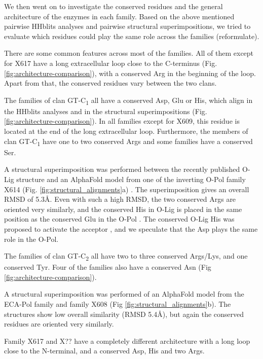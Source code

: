\documentclass{article}
\begin{document}
We then went on to investigate the conserved residues and the general architecture of the enzymes in each family. Based on the above mentioned pairwise HHblits analyses and pairwise structural superimpositions, we tried to evaluate which residues could play the same role across the families (reformulate).

There are some common features across most of the families. All of them except for X617 have a long extracellular loop close to the C-terminus (Fig. \ref{fig:architecture-comparison}), with a conserved Arg in the beginning of the loop. Apart from that, the conserved residues vary between the two clans.

The families of clan GT-C\textsubscript{1} all have a conserved Asp, Glu or His, which align in the HHblits analyses and in the structural superimpositions (Fig. \ref{fig:architecture-comparison}). In all families except for X609, this residue is located at the end of the long extracellular loop. %
Furthermore, the members of clan GT-C\textsubscript{1} have one to two conserved Args and some families have a conserved Ser.

A structural superimposition was performed between the recently published O-Lig structure \cite{ashraf_structural_2022} and an AlphaFold model from one of the  inverting O-Pol family X614 (Fig. \ref{fig:structural_alignments}a) \cite{jumper_highly_2021}. The superimposition gives an overall RMSD of 5.3Å. Even with such a high RMSD, the two conserved Args are oriented very similarly, and the conserved His in O-Lig is placed in the same position as the conserved Glu in the O-Pol . The conserved O-Lig His was proposed to activate the acceptor \cite{ashraf_structural_2022}, and we speculate that the Asp plays the same role in the O-Pol.

The families of clan GT-C\textsubscript{2} all have two to three conserved Args/Lys, and one conserved Tyr. Four of the families also have a conserved Asn (Fig \ref{fig:architecture-comparison}). 

A structural superimposition was performed of an AlphaFold model from the ECA-Pol family and family X608 (Fig \ref{fig:structural_alignments}b). The structures show low overall similarity (RMSD 5.4Å), but again the conserved residues are oriented very similarly.

Family X617 and X?? have a completely different architecture with a long loop close to the N-terminal, and a conserved Asp, His and two Args. %
\end{document}
